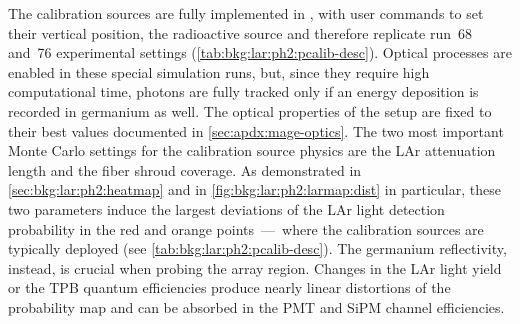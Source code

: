 The calibration sources are fully implemented in \mage, with user commands to set their
vertical position, the radioactive source and therefore replicate run~68 and~76
experimental settings (\cref{tab:bkg:lar:ph2:pcalib-desc}). Optical
processes are enabled in these special simulation runs, but, since they require high
computational time, photons are fully tracked only if an energy deposition is recorded in
germanium as well. The optical properties of the setup are fixed to their best values
documented in \cref{sec:apdx:mage-optics}. The two most important Monte Carlo settings
for the calibration source physics are the LAr attenuation length and the fiber shroud
coverage. As demonstrated in \cref{sec:bkg:lar:ph2:heatmap} and in
\cref{fig:bkg:lar:ph2:larmap:dist} in particular, these two parameters induce the largest
deviations of the LAr light detection probability in the red and orange points~---~where the
calibration sources are typically deployed (see \cref{tab:bkg:lar:ph2:pcalib-desc}). The
germanium reflectivity, instead, is crucial when probing the array region. Changes
in the LAr light yield or the TPB quantum efficiencies produce nearly linear distortions
of the probability map and can be absorbed in the PMT and SiPM channel efficiencies.

